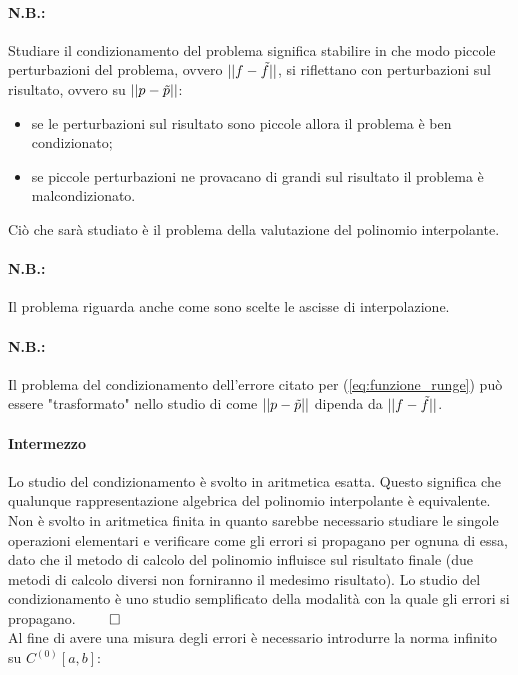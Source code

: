 \paragraph{N.B.:} Studiare il condizionamento del problema significa stabilire in che modo piccole perturbazioni del problema, ovvero $||f-\Tilde{f}||$, si riflettano con perturbazioni sul risultato, ovvero su $||p-\Tilde{p}||$:
\begin{itemize}
    \item se le perturbazioni sul risultato sono piccole allora il problema è ben condizionato;
    \item se piccole perturbazioni ne provacano di grandi sul risultato il problema è malcondizionato.
\end{itemize}

Ciò che sarà studiato è il problema della valutazione del polinomio interpolante.

\paragraph{N.B.:} Il problema riguarda anche come sono scelte le ascisse di interpolazione.

\paragraph{N.B.:} Il problema del condizionamento dell'errore citato per (\ref{eq:funzione_runge}) può essere "trasformato" nello studio di come $||p-\Tilde{p}||$ dipenda da $||f-\Tilde{f}||$. 

\paragraph{Intermezzo}{Lo studio del condizionamento è svolto in aritmetica esatta. Questo significa che qualunque rappresentazione algebrica del polinomio interpolante è equivalente. Non è svolto in aritmetica finita in quanto sarebbe necessario studiare le singole operazioni elementari e verificare come gli errori si propagano per ognuna di essa, dato che il metodo di calcolo del polinomio influisce sul risultato finale (due metodi di calcolo diversi non forniranno il medesimo risultato). Lo studio del condizionamento è uno studio semplificato della modalità con la quale gli errori si propagano. $\qed$}\\

Al fine di avere una misura degli errori è necessario introdurre la norma infinito su $C^{(0)}[a,b]$:

